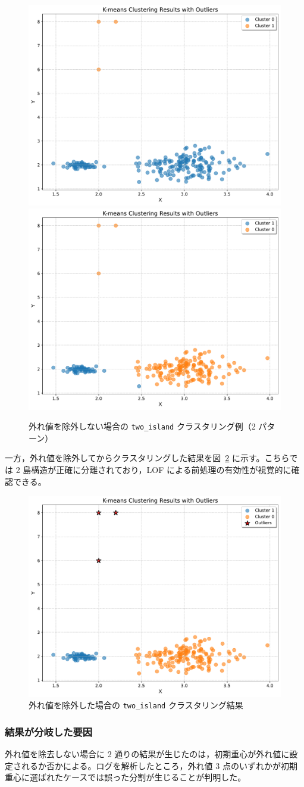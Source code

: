 \documentclass[a4j,dvipdfmx]{jsarticle}
\begin{document}
\begin{figure}[H]
  \centering
  \includegraphics[width=.4\textwidth]{two_island_with_outlier_output_plot_special.pdf}
  \includegraphics[width=.4\textwidth]{two_island_with_outlier_output_plot.pdf}
  \caption{外れ値を除外しない場合の \texttt{two\_island} クラスタリング例（2 パターン）}
  \label{fig:two-island-with-outlier}
\end{figure}

一方，外れ値を除外してからクラスタリングした結果を図~\ref{fig:two-island-with-outlier_right} に示す。こちらでは 2 島構造が正確に分離されており，LOF による前処理の有効性が視覚的に確認できる。

\begin{figure}[H]
  \centering
  \includegraphics[width=.4\textwidth]{two_island_with_outlier_output_plot_right.pdf}
  \caption{外れ値を除外した場合の \texttt{two\_island} クラスタリング結果}
  \label{fig:two-island-with-outlier_right}
\end{figure}

\subsubsection{結果が分岐した要因}
外れ値を除去しない場合に 2 通りの結果が生じたのは，初期重心が外れ値に設定されるか否かによる。ログを解析したところ，外れ値 3 点のいずれかが初期重心に選ばれたケースでは誤った分割が生じることが判明した。
\end{document}
